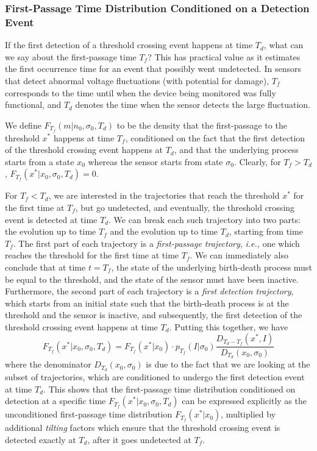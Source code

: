 \subsubsection{First-Passage Time Distribution Conditioned on a Detection Event} \label{cond}

If the first detection of a threshold crossing event happens at time $T_d$, what can we say about the first-passage time $T_f$? This has practical value as it estimates the first occurrence time for an event that possibly went
undetected. In sensors that detect abnormal voltage fluctuations (with potential for damage), $T_f$ corresponds to the time until when the device being monitored was fully functional, and $T_d$ denotes the time when the sensor detects the large fluctuation. 

We define $F_{T_f}(m|n_0,\sigma_0, T_d)$ to be the density that the first-passage to the threshold $x^*$ happens at time $T_f$, conditioned on the fact that the first detection of the threshold crossing event happens at $T_d$, and that the underlying process starts from a state $x_0$ whereas the sensor starts from state $\sigma_0$. Clearly, for $T_f>T_d$, $F_{T_f}(x^*|x_0,\sigma_0, T_d) = 0$.

For $T_f<T_d$, we are interested in the trajectories that reach the threshold $x^*$ for the first time at $T_f$, but go undetected, and eventually, the threshold crossing event is detected at time $T_d$. We can break each such trajectory into two parts: the evolution up to time $T_f$ and the evolution up to time $T_d$, starting from time $T_f$. The first part of each trajectory is a \emph{first-passage trajectory}, {\it{i.e.,}} one which reaches the threshold for the first time at time $T_f$. We can immediately also conclude that at time $t=T_f$, the state of the underlying birth-death process must be equal to the threshold, and the state of the sensor must have been inactive. Furthermore, the second part of each trajectory is a \emph{first detection trajectory}, which starts from an initial state such that the birth-death process is at the threshold and the sensor is inactive, and subsequently, the first detection of the threshold crossing event happens at time $T_d$. Putting this together, we have
\begin{equation}
F_{T_f}(x^*|x_0, \sigma_0,T_d) = F_{T_f}(x^*|x_0) \cdot p_{T_f}(I|\sigma_0)\frac{D_{T_d-T_f}(x^*,I)}{D_{T_d}(x_0,\sigma_0)}
\end{equation}
where the denominator $D_{T_d}(x_0,\sigma_0)$ is due to the fact that we are looking at the subset of trajectories, which are conditioned to undergo the first detection event at time $T_d$. This shows that the first-passage time distribution conditioned on detection at a specific time $F_{T_f}(x^*|x_0,\sigma_0, T_d)$ can be expressed explicitly as the unconditioned first-passage time distribution $F_{T_f}(x^*|x_0)$, multiplied by additional \emph{tilting} factors which ensure that the threshold crossing event is detected exactly at $T_d$, after it goes undetected at $T_f$.

